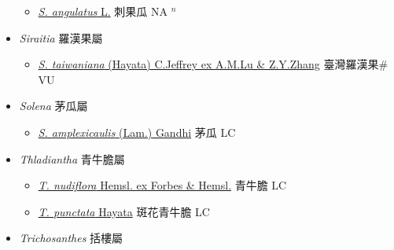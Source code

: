 \begin{itemize}
  \begin{itemize}
        \item[] \href{http://www.theplantlist.org/tpl1.1/search?q=Sicyos+angulatus}{\textit{S. angulatus} L.}   刺果瓜 NA $^n$
  \end{itemize}
 \item[] \textit{Siraitia} 羅漢果屬
                    
  \begin{itemize}
        \item[] \href{http://www.theplantlist.org/tpl1.1/search?q=Siraitia+taiwaniana}{\textit{S. taiwaniana} (Hayata) C.Jeffrey ex A.M.Lu \& Z.Y.Zhang}   臺灣羅漢果\# VU
  \end{itemize}
 \item[] \textit{Solena} 茅瓜屬
                    
  \begin{itemize}
        \item[] \href{http://www.theplantlist.org/tpl1.1/search?q=Solena+amplexicaulis}{\textit{S. amplexicaulis} (Lam.) Gandhi}   茅瓜 LC
  \end{itemize}
 \item[] \textit{Thladiantha} 青牛膽屬
                    
  \begin{itemize}
        \item[] \href{http://www.theplantlist.org/tpl1.1/search?q=Thladiantha+nudiflora}{\textit{T. nudiflora} Hemsl. ex Forbes \& Hemsl.}   青牛膽 LC
        \item[] \href{http://www.theplantlist.org/tpl1.1/search?q=Thladiantha+punctata}{\textit{T. punctata} Hayata}   斑花青牛膽 LC
  \end{itemize}
 \item[] \textit{Trichosanthes} 括樓屬
                    

\end{itemize}

